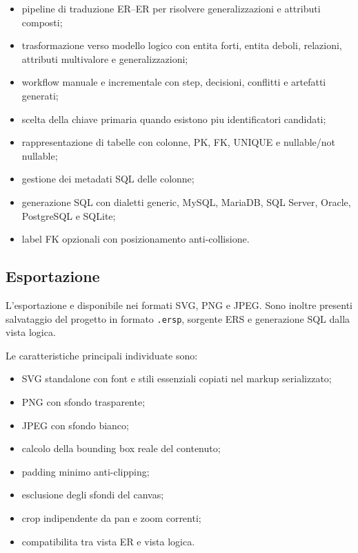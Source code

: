 \begin{itemize}
    \item pipeline di traduzione ER--ER per risolvere generalizzazioni e attributi composti;
    \item trasformazione verso modello logico con entita forti, entita deboli, relazioni, attributi multivalore e generalizzazioni;
    \item workflow manuale e incrementale con step, decisioni, conflitti e artefatti generati;
    \item scelta della chiave primaria quando esistono piu identificatori candidati;
    \item rappresentazione di tabelle con colonne, PK, FK, UNIQUE e nullable/not nullable;
    \item gestione dei metadati SQL delle colonne;
    \item generazione SQL con dialetti generic, MySQL, MariaDB, SQL Server, Oracle, PostgreSQL e SQLite;
    \item label FK opzionali con posizionamento anti-collisione.
\end{itemize}

\subsection{Esportazione}

L'esportazione e disponibile nei formati SVG, PNG e JPEG. Sono inoltre presenti salvataggio del progetto in formato \texttt{.ersp}, sorgente ERS e generazione SQL dalla vista logica.

Le caratteristiche principali individuate sono:

\begin{itemize}
    \item SVG standalone con font e stili essenziali copiati nel markup serializzato;
    \item PNG con sfondo trasparente;
    \item JPEG con sfondo bianco;
    \item calcolo della bounding box reale del contenuto;
    \item padding minimo anti-clipping;
    \item esclusione degli sfondi del canvas;
    \item crop indipendente da pan e zoom correnti;
    \item compatibilita tra vista ER e vista logica.
\end{itemize}

